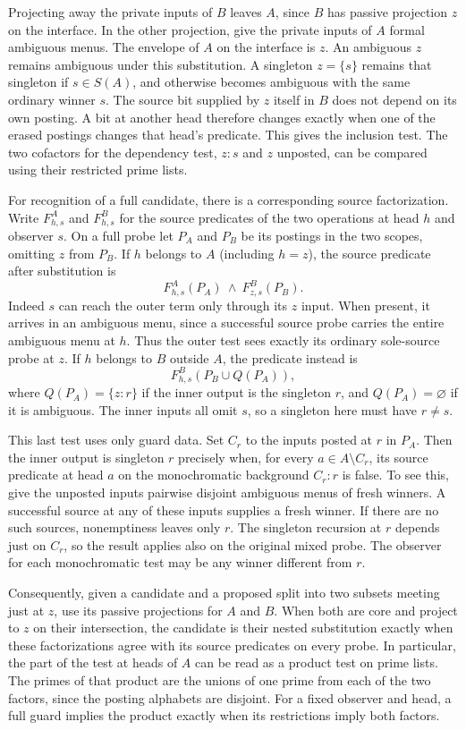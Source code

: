 Projecting away the private inputs of $B$ leaves
$A$, since $B$ has passive projection $z$ on the
interface. In the other projection, give the
private inputs of $A$ formal ambiguous menus.
The envelope of $A$ on the interface is $z$.
An ambiguous $z$ remains ambiguous under this
substitution. A singleton $z=\{s\}$ remains that
singleton if $s\in S(A)$, and otherwise becomes
ambiguous with the same ordinary winner $s$.
The source bit supplied by $z$ itself in $B$
does not depend on its own posting. A bit at
another head therefore changes exactly when
one of the erased postings changes that head's
predicate. This gives the inclusion test.
The two cofactors for the dependency test,
$z:s$ and $z$ unposted, can be compared using
their restricted prime lists.

For recognition of a full candidate, there is a corresponding
source factorization. Write $F^A_{h,s}$ and $F^B_{h,s}$ for the
source predicates of the two operations at head $h$ and observer
$s$. On a full probe let $P_A$ and $P_B$ be its postings in the
two scopes, omitting $z$ from $P_B$. If $h$ belongs to $A$ (including
$h=z$), the source predicate after substitution is
\[
  F^A_{h,s}(P_A)\ \land\ F^B_{z,s}(P_B).
\]
Indeed $s$ can reach the outer term only through its $z$ input.
When present, it arrives in an ambiguous menu, since a successful
source probe carries the entire ambiguous menu at $h$. Thus the
outer test sees exactly its ordinary sole-source probe at $z$.
If $h$ belongs to $B$ outside $A$, the predicate instead is
\[
  F^B_{h,s}(P_B\cup Q(P_A)),
\]
where $Q(P_A)=\{z:r\}$ if the inner output is the singleton $r$,
and $Q(P_A)=\varnothing$ if it is ambiguous. The inner inputs all
omit $s$, so a singleton here must have $r\ne s$.

This last test uses only guard data. Set $C_r$ to the inputs posted
at $r$ in $P_A$. Then the inner output is singleton $r$ precisely
when, for every $a\in A\setminus C_r$, its source predicate at head
$a$ on the monochromatic background $C_r:r$ is false. To see this,
give the unposted inputs pairwise disjoint ambiguous menus of
fresh winners. A successful source at any of these inputs supplies
a fresh winner. If there are no such sources, nonemptiness leaves
only $r$. The singleton recursion at $r$ depends just on $C_r$,
so the result applies also on the original mixed probe. The observer
for each monochromatic test may be any winner different from $r$.

Consequently, given a candidate and a proposed split into two
subsets meeting just at $z$, use its passive projections for $A$
and $B$. When both are core and project to $z$ on their intersection,
the candidate is their nested substitution exactly when these
factorizations agree with its source predicates on every probe.
In particular, the part of the test at heads of $A$ can be read
as a product test on prime lists. The primes of that product are
the unions of one prime from each of the two factors, since the
posting alphabets are disjoint. For a fixed observer and head, a
full guard implies the product exactly when its restrictions
imply both factors.

